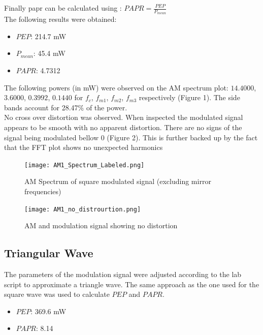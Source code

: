 \documentclass[a4paper]{article}
\begin{document}
    \noindent Finally \gls{papr} can be calculated using : $PAPR = \frac{PEP}{P_{mean}}$ \\

    \noindent The following results were obtained: 
        
\begin{itemize}
    \item $PEP$: 214.7 mW
    \item $P_{mean}$: 45.4 mW
    \item $PAPR$: 4.7312
\end{itemize}

\noindent The following powers (in mW) were observed on the AM spectrum plot: $14.4000$, $3.6000$, $0.3992$, $0.1440$ for $f_c$, $f_{m1}$, $f_{m2}$, $f_{m3}$ respectively (Figure 1). The side bands account for 28.47\% of the power. \\

\noindent No cross over distortion was observed. When inspected the modulated signal appears to be smooth with no apparent distortion. There are no signs of the signal being modulated bellow 0 (Figure 2). This is further backed up by the fact that the FFT plot shows no unexpected harmonics

\begin{figure}[htbp]
\centering

\texttt{[image: AM1\_Spectrum\_Labeled.png]}
\caption{AM Spectrum of square modulated signal (excluding mirror frequencies)}

\end{figure}

\begin{figure}[htbp]
\centering

\texttt{[image: AM1\_no\_distrourtion.png]}
\caption{AM and modulation signal showing no distortion}

\end{figure}

\newpage

\subsection*{Triangular Wave}
The parameters of the modulation signal were adjusted according to the lab script to approximate a triangle wave. The same approach as the one used for the square wave was used to calculate $PEP$ and $PAPR$. \\

\noindent

\begin{itemize}
    \item ${PEP}$: 369.6 mW
    \item ${PAPR}$: 8.14
\end{itemize}
\end{document}
